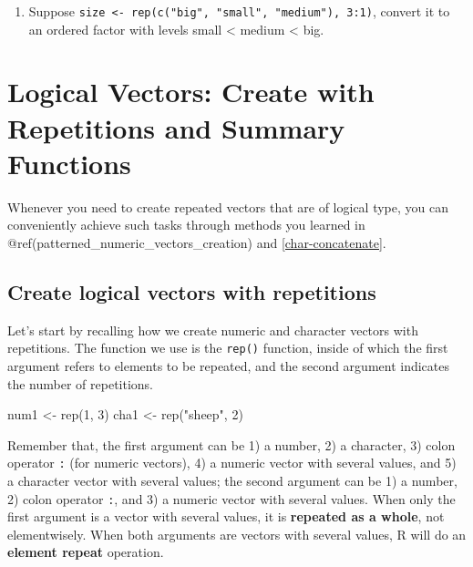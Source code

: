 \documentclass[
]{book}
\newenvironment{Shaded}{\begin{snugshade}}{\end{snugshade}}
\newcommand{\DecValTok}[1]{\textcolor[rgb]{0.00,0.00,0.81}{#1}}
\newcommand{\FunctionTok}[1]{\textcolor[rgb]{0.00,0.00,0.00}{#1}}
\newcommand{\NormalTok}[1]{#1}
\newcommand{\OtherTok}[1]{\textcolor[rgb]{0.56,0.35,0.01}{#1}}
\newcommand{\StringTok}[1]{\textcolor[rgb]{0.31,0.60,0.02}{#1}}
\providecommand{\tightlist}{%
  \setlength{\itemsep}{0pt}\setlength{\parskip}{0pt}}
\begin{document}
\begin{enumerate}
\def\labelenumi{\arabic{enumi}.}
\setcounter{enumi}{4}
\tightlist
\item
  Suppose \texttt{size\ \textless{}-\ rep(c("big",\ "small",\ "medium"),\ 3:1)}, convert it to an ordered factor with levels small \textless{} medium \textless{} big.
\end{enumerate}

\hypertarget{logical-patterns}{%
\section{Logical Vectors: Create with Repetitions and Summary Functions}\label{logical-patterns}}

Whenever you need to create repeated vectors that are of logical type, you can conveniently achieve such tasks through methods you learned in @ref(patterned\_numeric\_vectors\_creation) and \ref{char-concatenate}.

\hypertarget{create-logical-vectors-with-repetitions}{%
\subsection{Create logical vectors with repetitions}\label{create-logical-vectors-with-repetitions}}

Let's start by recalling how we create numeric and character vectors with repetitions. The function we use is the \texttt{rep()} function, inside of which the first argument refers to elements to be repeated, and the second argument indicates the number of repetitions.

\begin{Shaded}
\begin{Highlighting}[]
\NormalTok{num1 }\OtherTok{\textless{}{-}} \FunctionTok{rep}\NormalTok{(}\DecValTok{1}\NormalTok{, }\DecValTok{3}\NormalTok{)}
\NormalTok{cha1 }\OtherTok{\textless{}{-}} \FunctionTok{rep}\NormalTok{(}\StringTok{"sheep"}\NormalTok{, }\DecValTok{2}\NormalTok{)}
\end{Highlighting}
\end{Shaded}

Remember that, the first argument can be 1) a number, 2) a character, 3) colon operator \texttt{:} (for numeric vectors), 4) a numeric vector with several values, and 5) a character vector with several values; the second argument can be 1) a number, 2) colon operator \texttt{:}, and 3) a numeric vector with several values. When only the first argument is a vector with several values, it is \textbf{repeated as a whole}, not elementwisely. When both arguments are vectors with several values, R will do an \textbf{element repeat} operation.
\end{document}
